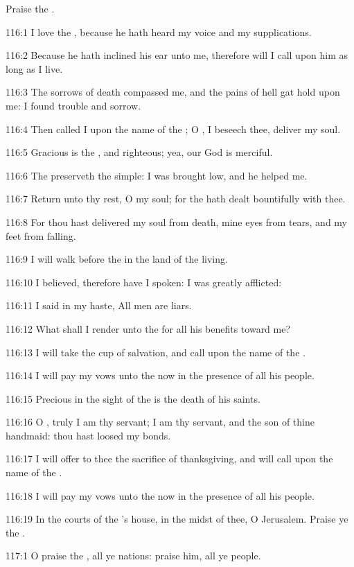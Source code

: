 Praise the \LORD.



116:1 I love the \LORD, because he hath heard my voice and my
supplications.

116:2 Because he hath inclined his ear unto me, therefore will I call
upon him as long as I live.

116:3 The sorrows of death compassed me, and the pains of hell gat
hold upon me: I found trouble and sorrow.

116:4 Then called I upon the name of the \LORD; O \LORD, I beseech thee,
deliver my soul.

116:5 Gracious is the \LORD, and righteous; yea, our God is merciful.

116:6 The \LORD preserveth the simple: I was brought low, and he helped
me.

116:7 Return unto thy rest, O my soul; for the \LORD hath dealt
bountifully with thee.

116:8 For thou hast delivered my soul from death, mine eyes from
tears, and my feet from falling.

116:9 I will walk before the \LORD in the land of the living.

116:10 I believed, therefore have I spoken: I was greatly afflicted:

116:11 I said in my haste, All men are liars.

116:12 What shall I render unto the \LORD for all his benefits toward
me?

116:13 I will take the cup of salvation, and call upon the name of the
\LORD.

116:14 I will pay my vows unto the \LORD now in the presence of all his
people.

116:15 Precious in the sight of the \LORD is the death of his saints.

116:16 O \LORD, truly I am thy servant; I am thy servant, and the son
of thine handmaid: thou hast loosed my bonds.

116:17 I will offer to thee the sacrifice of thanksgiving, and will
call upon the name of the \LORD.

116:18 I will pay my vows unto the \LORD now in the presence of all his
people.

116:19 In the courts of the \LORD's house, in the midst of thee, O
Jerusalem. Praise ye the \LORD.



117:1 O praise the \LORD, all ye nations: praise him, all ye people.

